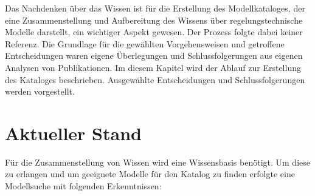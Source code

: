 
Das Nachdenken über das Wissen ist für die Erstellung des Modellkataloges, der eine Zusammenstellung und Aufbereitung des Wissens über regelungstechnische Modelle darstellt, ein wichtiger Aspekt gewesen. Der Prozess folgte dabei keiner Referenz. Die Grundlage für die gewählten Vorgehensweisen und getroffene Entscheidungen waren eigene Überlegungen und Schlussfolgerungen aus eigenen Analysen von Publikationen. Im diesem Kapitel wird der Ablauf zur Erstellung des Kataloges beschrieben. Ausgewählte Entscheidungen und Schlussfolgerungen werden vorgestellt. %

\section{Aktueller Stand}
\label{Ch:ErstProz:Sec:CurrentState}
Für die Zusammenstellung von Wissen wird eine Wissensbasis benötigt. Um diese zu erlangen und um geeignete Modelle für den Katalog zu finden erfolgte eine Modellsuche mit folgenden Erkenntnissen:

